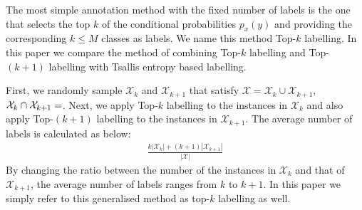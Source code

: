 \documentclass[a4paper,conference]{IEEEtran}
\begin{document}
The most simple annotation method with the fixed number of labels is the one that selects the top $k$ of the conditional probabilities $p_{x}(y)$ and providing the corresponding $k \le M$ classes as labels.
We name this method Top-$k$ labelling.
In this paper we compare the method of combining Top-$k$ labelling and Top-$(k + 1)$ labelling with Tsallis entropy based labelling.

First, we randomly sample $\mathcal{X}_{k}$ and $\mathcal{X}_{k+1}$ that satisfy $\mathcal{X} = \mathcal{X}_{k} \cup \mathcal{X}_{k+1}$, $\mathcal{X}_{k} \cap \mathcal{X}_{k+1} = \empty$.
Next, we apply Top-$k$ labelling to the instances in $\mathcal{X}_{k}$ and also apply Top-$(k+1)$ labelling to the instances in $\mathcal{X}_{k+1}$.
The average number of labels is calculated as below:
\begin{align}
    \frac{k|\mathcal{X}_{k}| + (k+1)|\mathcal{X}_{k+1}|}{|\mathcal{X}|}
\end{align}
By changing the ratio between the number of the instances in $\mathcal{X}_{k}$ and that of $\mathcal{X}_{k+1}$, the average number of labels ranges from $k$ to $k + 1$.
In this paper we simply refer to this generalised method as top-$k$ labelling as well.

\end{document}
